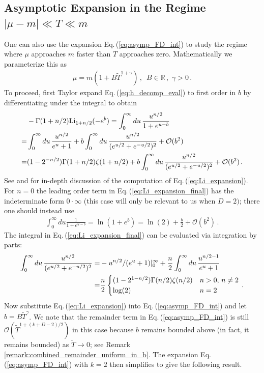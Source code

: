 \documentclass[sn-mathphys,Numbered]{sn-jnl}
\newcommand{\req}[1]{Eq.\,(\ref{#1})}
\newcommand*{\xred}{\color{black}}
\begin{document}
\subsection{Asymptotic Expansion in the Regime $|\mu-m|\ll T\ll m$}\label{sec:decaying_b}
One can also use the expansion \req{eq:asymp_FD_int} to study the regime where $\mu$ approaches $m$ faster than $T$ approaches zero. Mathematically we parameterize this as 
\begin{align}\label{eq:mu_decay_faster}
\mu=m(1+B\widetilde{T}^{1+\gamma})\,,\,\,\, B\in\mathbb{R}\,,\,\, \gamma>0\,. 
\end{align}
 To proceed, first Taylor expand \req{eq:h_decomp_eval} to first order in $b$ by differentiating under the integral to obtain
\begin{align}\label{eq:Li_expansion}
 &-\Gamma(1+n/2)\mathrm{Li}_{1+n/2}(-e^b) =\int_0^\infty du \, \frac{u^{n/2}}{1+e^{u-b}} \\
 =&\int_0^\infty du\,\frac{u^{n/2}}{e^u+1}+b\int_0^\infty du\,\frac{u^{n/2}}{(e^{u/2}+e^{-u/2})^2} +\mathcal{O}(b^2)\notag\\
 =&(1 - 2^{-n/2}) \Gamma(1 + n/2) \zeta(1 + n/2)+ b\int_0^\infty du\,\frac{u^{n/2}}{(e^{u/2}+e^{-u/2})^2} +\mathcal{O}(b^2)\,.\label{eq:Li_expansion_final}
\end{align}
See \cite{dingle1957fermi} and \cite{10.1063/1.1350634} for in-depth discussion of the computation of \req{eq:Li_expansion}. For $n=0$ the leading order term in \req{eq:Li_expansion_final} has the indeterminate form $0\cdot \infty$ (this case will only be relevant to us when $D=2)$; there one should instead use
\begin{align}
\int_0^\infty du \frac{1}{1+e^{u-b}}=\ln(1+e^b)= \ln(2)+\frac{b}{2}+\mathcal{O}(b^2)\,.
\end{align}
{\xred 
The integral in \req{eq:Li_expansion_final} can be evaluated via integration by parts:
\begin{align}\label{eq:Li_int_order_1}
 \int_0^\infty du\,\frac{u^{n/2}}{(e^{u/2}+e^{-u/2})^2}=&-u^{n/2}/(e^u+1)|_0^\infty+ \frac{n}{2}\int_0^\infty du\, \frac{u^{n/2-1}}{e^{u}+1}\\
 =&\frac{n}{2}\begin{cases}
 (1-2^{1-n/2})\Gamma(n/2)\zeta(n/2)& n>0,\,n\neq 2\\
 \log(2) &n=2
 \end{cases}\,.\notag
 \end{align}}
Now substitute \req{eq:Li_expansion} into \req{eq:asymp_FD_int} and let $b=B\widetilde{T}^\gamma$. We note that the remainder term in \req{eq:asymp_FD_int} is still $\mathcal{O}(\widetilde{T}^{1+(k+D-2)/2})$ in this case because $b$ remains bounded above (in fact, it remains bounded) as $\widetilde{T}\to 0$; see Remark \ref{remark:combined_remainder_uniform_in_b}. The expansion \req{eq:asymp_FD_int} with $k=2$ then simplifies to give the following result.
\end{document}
